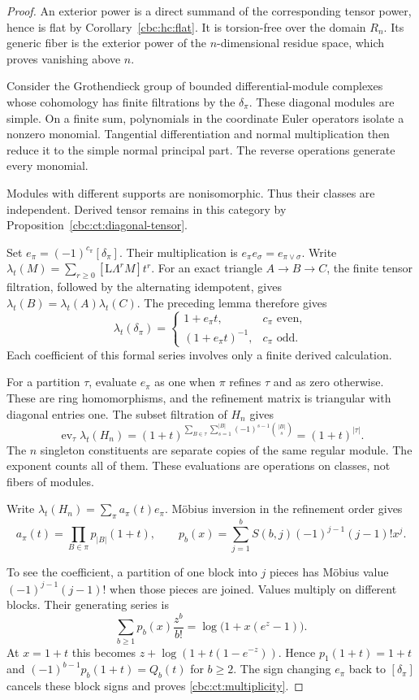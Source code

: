 \begin{proof}
An exterior power is a direct summand of the corresponding
tensor power, hence is flat by Corollary~\ref{cbc:hc:flat}.
It is torsion-free over the domain $R_n$. Its generic fiber
is the exterior power of the $n$-dimensional residue space,
which proves vanishing above $n$.

Consider the Grothendieck group of bounded differential-module
complexes whose cohomology has finite filtrations by the
$\delta_\pi$. These diagonal modules are simple. On a finite
sum, polynomials in the coordinate Euler operators isolate a
nonzero monomial. Tangential differentiation and normal
multiplication then reduce it to the simple normal principal
part. The reverse operations generate every monomial.

Modules with
different supports are nonisomorphic. Thus their classes are
independent. Derived tensor remains in this category by
Proposition~\ref{cbc:ct:diagonal-tensor}.

Set $e_\pi=(-1)^{c_\pi}[\delta_\pi]$. Their multiplication
is $e_\pi e_\sigma=e_{\pi\vee\sigma}$. Write
$\lambda_t(M)=\sum_{r\geq0}[\mathrm L\Lambda^rM]t^r$.
For an exact triangle $A\to B\to C$, the finite tensor
filtration, followed by the alternating idempotent, gives
$\lambda_t(B)=\lambda_t(A)\lambda_t(C)$. The preceding lemma
therefore gives
\[
 \lambda_t(\delta_\pi)=
 \begin{cases}
  1+e_\pi t,&c_\pi\text{ even},\\
  (1+e_\pi t)^{-1},&c_\pi\text{ odd}.
 \end{cases}
\]
Each coefficient of this formal series involves only a finite
derived calculation.

For a partition $\tau$, evaluate $e_\pi$ as one when $\pi$
refines $\tau$ and as zero otherwise. These are ring
homomorphisms, and the refinement matrix is triangular with
diagonal entries one. The subset filtration of $H_n$ gives
\[
 \operatorname{ev}_\tau\lambda_t(H_n)
 =(1+t)^{\sum_{B\in\tau}\sum_{s=1}^{|B|}
                        (-1)^{s-1}\binom{|B|}{s}}
 =(1+t)^{|\tau|}.
\]
The $n$ singleton constituents are separate copies of the same
regular module. The exponent counts all of them. These
evaluations are operations on classes, not fibers of modules.

Write $\lambda_t(H_n)=\sum_\pi a_\pi(t)e_\pi$.
M\"obius inversion in the refinement order gives
\[
 a_\pi(t)=\prod_{B\in\pi}p_{|B|}(1+t),\qquad
 p_b(x)=\sum_{j=1}^bS(b,j)(-1)^{j-1}(j-1)!x^j.
\]

To see the coefficient, a partition of one block into $j$
pieces has M\"obius value $(-1)^{j-1}(j-1)!$ when those
pieces are joined. Values multiply on different blocks. Their
generating series is
\[
 \sum_{b\geq1}p_b(x)\frac{z^b}{b!}
       =\log\bigl(1+x(e^z-1)\bigr).
\]
At $x=1+t$ this becomes
$z+\log(1+t(1-e^{-z}))$. Hence $p_1(1+t)=1+t$ and
$(-1)^{b-1}p_b(1+t)=Q_b(t)$ for $b\geq2$.
The sign changing $e_\pi$ back to $[\delta_\pi]$ cancels
these block signs and proves \eqref{cbc:ct:multiplicity}.


\end{proof}
